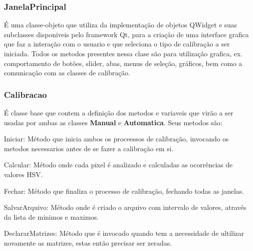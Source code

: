 \subsubsection{JanelaPrincipal}
É uma classe-objeto que utiliza da implementação de objetos QWidget e suas subclasses disponiveis pelo framework Qt, para a criação de uma interface grafica que faz a interação com o usuario e que seleciona o tipo de calibração a ser iniciada. Todos os metodos presentes nessa clase são para utilização grafica, ex. comportamento de botões, slider, abas, menus de seleção, gráficos, bem como a comunicação com as classes de calibração.	

\subsubsection{Calibracao}
É classe base que contem a definição dos metodos e variaveis que virão a ser usadas por ambas as classes \textbf{Manual} e \textbf{Automatica}. Seus metodos são:
	\begin{description}
	\item Iniciar: Método que inicia ambos os proceessos de calibração, invocando os metodos necessarios antes de se fazer a calibração em si.
	\item Calcular: Método onde cada pixel é analizado e calculadas as ocorrências de valores HSV.
	\item Fechar: Método que finaliza o processo de calibração, fechando todas as janelas.
	\item SalvarArquivo: Método onde é criado o arquivo com intervalo de valores, através da lista de minimos e maximos.
	\item DeclararMatrizes: Método que é invocado quando tem a necessidade de ultilizar novamente as matrizes, estas então precisar ser zeradas.
	\end{description}


